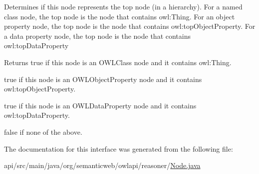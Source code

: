 Determines if this node represents the top node (in a hierarchy). For a named class node, the top node is the node that contains {\ttfamily owl\-:Thing}. For an object property node, the top node is the node that contains {\ttfamily owl\-:top\-Object\-Property}. For a data property node, the top node is the node that contains {\ttfamily owl\-:top\-Data\-Property} \begin{DoxyReturn}{Returns}
{\ttfamily true} if this node is an {\ttfamily O\-W\-L\-Class} node and it contains {\ttfamily owl\-:Thing}. 
\end{DoxyReturn}
{\ttfamily true} if this node is an {\ttfamily O\-W\-L\-Object\-Property} node and it contains {\ttfamily owl\-:top\-Object\-Property}. 

{\ttfamily true} if this node is an {\ttfamily O\-W\-L\-Data\-Property} node and it contains {\ttfamily owl\-:top\-Data\-Property}. 

{\ttfamily false} if none of the above. 

The documentation for this interface was generated from the following file\-:\begin{DoxyCompactItemize}
\item 
api/src/main/java/org/semanticweb/owlapi/reasoner/\hyperlink{api_2src_2main_2java_2org_2semanticweb_2owlapi_2reasoner_2_node_8java}{Node.\-java}\end{DoxyCompactItemize}
